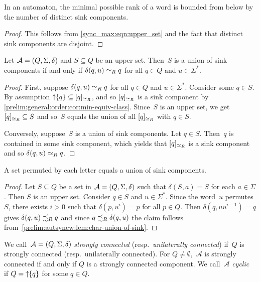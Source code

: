 \begin{proposition} \label{prelim:autsyncw:lem:minrank}
	In an automaton, the minimal possible rank of a word
	is bounded from below by the number of distinct sink components.
\end{proposition}
\begin{proof}
	This follows from \cref{sync_max:eqn:upper_set} 	
	and the fact that distinct sink components are disjoint.
\end{proof}

\begin{proposition} \label{prelim:autsyncw:lem:char-union-of-sink}
	Let $\mathcal A = (Q, \Sigma, \delta)$ and
	$S \subseteq Q$ be an upper set.
	Then~$S$ is a union of sink components
	if and only if $\delta(q, u) \simeq_R q$ for all $q \in Q$
	and $u \in \Sigma^*$.
\end{proposition}
\begin{proof}
	First, suppose $\delta(q, u) \simeq_R q$ for all $q \in Q$
	and $u \in \Sigma^*$. Consider some $q \in S$.
	By assumption $\mbox{\ensuremath{\displaystyle \uparrow \!\!\{q\}}} \subseteq [q]_{\simeq_R}$,
	and so $[q]_{\simeq_R}$ is a sink component
	by \cref{prelim:general:order:cor:min-equiv-class}. 
	Since~$S$ is an upper set, we get $[q]_{\simeq_R} \subseteq S$
	and so~$S$ equals the union of all $[q]_{\simeq_R}$
	with $q \in S$.
	
	Conversely, suppose~$S$ is a union of sink components.
	Let $q\in S$. Then~$q$ is contained
	in some sink component, which yields that $[q]_{\simeq_R}$
	is a sink component and so $\delta(q, u) \simeq_R q$.	
\end{proof}

\begin{corollary} \label{prelim:autsyncw:lem:perm-each-letter-sink}
	A set permuted by each letter equals a union
	of sink components.	
\end{corollary}
\begin{proof}
	Let $S \subseteq Q$ be a set in $\mathcal A = (Q, \Sigma, \delta)$
	such that $\delta(S, a) = S$ for each $a \in \Sigma$.
	Then $S$ is an upper set.	
	Consider $q \in S$ and $u \in \Sigma^*$.	
	Since the word~$u$ permutes~$S$,
	there exists $i > 0$
	such that $\delta(p, u^i) = p$
	for all $p \in Q$.
	Then $\delta(q, u u^{i- 1}) = q$
	gives $\delta(q, u) \precsim_R q$
	and since $q \precsim_R \delta(q, u)$
	the claim follows from~\cref{prelim:autsyncw:lem:char-union-of-sink}.
\end{proof}

We call~$\mathcal A = (Q, \Sigma, \delta)$ \emph{strongly connected} (resp.~\emph{unilaterally connected})
if~$Q$ is strongly connected (resp.~unilaterally connected).
For $Q \ne \emptyset$,~$\mathcal A$ is strongly connected if and only if $Q$
is a strongly connected component. 
We call~$\mathcal A$ \emph{cyclic}~\cite{Ito04} if $Q = \mbox{\ensuremath{\displaystyle \uparrow \!\!\{q\}}}$
for some $q \in Q$.

